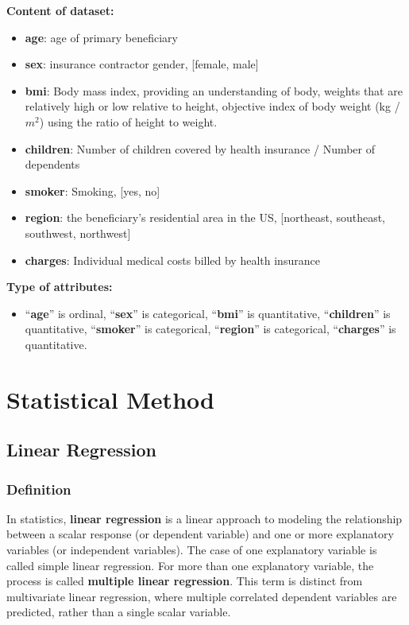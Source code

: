 \documentclass[a4paper]{article}
\begin{document}
{\large \textbf{Content of dataset:}}
 \begin{itemize}
     \item \textbf{age}: age of primary beneficiary
     \item \textbf{sex}: insurance contractor gender, [female, male]
     \item \textbf{bmi}: Body mass index, providing an understanding of body, weights that are relatively high or low relative to height, objective index of body weight (kg / $m^2$) using the ratio of height to weight.
     \item \textbf{children}: Number of children covered by health insurance / Number of dependents
     \item \textbf{smoker}: Smoking, [yes, no]
     \item \textbf{region}: the beneficiary's residential area in the US, [northeast, southeast, southwest, northwest]
     \item \textbf{charges}: Individual medical costs billed by health insurance
 \end{itemize}
{\large \textbf{Type of attributes:}}
 \begin{itemize}
     \item “\textbf{age}” is ordinal, “\textbf{sex}” is categorical, “\textbf{bmi}” is quantitative, “\textbf{children}” is quantitative, “\textbf{smoker}” is categorical, “\textbf{region}” is categorical, “\textbf{charges}” is quantitative.
 \end{itemize}



\section{Statistical Method}
\subsection{Linear Regression}
\subsubsection{Definition}
In statistics, \textbf{linear regression} is a linear approach to modeling the relationship between a scalar response (or dependent variable) and one or more explanatory variables (or independent variables). The case of one explanatory variable is called simple linear regression. For more than one explanatory variable, the process is called \textbf{multiple linear regression}. This term is distinct from multivariate linear regression, where multiple correlated dependent variables are predicted, rather than a single scalar variable.
\end{document}
